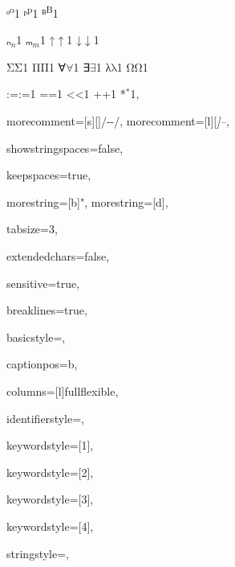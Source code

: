 {{ᵒ}{{\textsuperscript{o}}}1
{ᵖ}{{\textsuperscript{p}}}1
{ᴮ}{{\textsuperscript{B}}}1


{ₙ}{{\ensuremath{_n}}}1
{ₘ}{{\ensuremath{_m}}}1
{↑}{{\ensuremath{\uparrow}}}1
{↓}{{\ensuremath{\downarrow}}}1


{Σ}{{\color{symbolcolor}\ensuremath{\mathrm{\Sigma}}}}1
{Π}{{\color{symbolcolor}\ensuremath{\mathrm{\Pi}}}}1
{∀}{{\color{symbolcolor}\ensuremath{\forall}}}1
{∃}{{\color{symbolcolor}\ensuremath{\exists}}}1
{λ}{{\color{symbolcolor}\ensuremath{\mathrm{\lambda}}}}1
{Ω}{{\color{symbolcolor}\ensuremath{\mathrm{\Omega}}}}1

{:=}{{\color{symbolcolor}:=}}1
{=}{{\color{symbolcolor}=}}1
{<}{{\color{symbolcolor}<}}1
{+}{{\color{symbolcolor}+}}1
{*}{{\color{symbolcolor}\ensuremath{{}^{*}}}}1,

morecomment=[s][\color{commentcolor}]{/-}{-/},
morecomment=[l][\itshape \color{commentcolor}]{--},

showstringspaces=false,

keepspaces=true,

morestring=[b]",
morestring=[d],

tabsize=3,

extendedchars=false,

sensitive=true,

breaklines=true,

basicstyle=\ttfamily,

captionpos=b,

columns=[l]fullflexible,


identifierstyle={\ttfamily\color{black}},

keywordstyle=[1]{\ttfamily\color{keywordcolor}},

keywordstyle=[2]{\ttfamily\color{sortcolor}},

keywordstyle=[3]{\ttfamily\color{tacticcolor}},

keywordstyle=[4]{\ttfamily\color{attributecolor}},

stringstyle=\ttfamily,

}